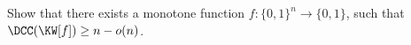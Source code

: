 Show that there exists a monotone function $f\colon \{0, 1\}^n \to \{0, 1\}$, such that
$\DCC(\KW[f]) \ge n - o(n)$.
